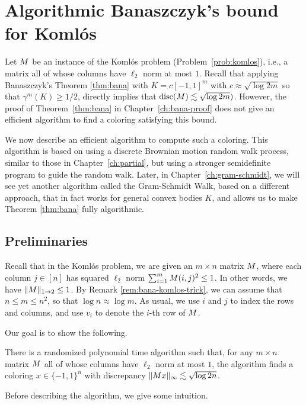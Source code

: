 
\chapter{Algorithmic Banaszczyk's bound for Koml\'os}
\label{ch:algo-komlos-bana}


Let $M$ be an instance of the Koml\'{o}s problem (Problem~\ref{prob:komlos}), i.e., a matrix all of whose columns have $\ell_2$ norm at most $1$.
Recall that %
applying Banaszczyk's Theorem \ref{thm:bana} with $K = c [-1,1]^m$ with $c \approx \sqrt{\log 2m}$ so that $\gamma^m(K)\geq 1/2$, directly implies that $\operatorname{disc}(M) \lesssim \sqrt{\log 2m})$. However, the proof of Theorem~\ref{thm:bana} in Chapter~\ref{ch:bana-proof} does not give an efficient algorithm to find a coloring satisfying this bound.

We now describe an efficient algorithm to compute such a coloring.
This algorithm is based on using a discrete Brownian motion random walk process, similar to those in Chapter~\ref{ch:partial}, but using a stronger semidefinite program to guide the random walk. 
Later, in Chapter~\ref{ch:gram-schmidt}, we will see yet another algorithm called the Gram-Schmidt Walk, based on a different approach, that in fact works for general convex bodies $K$, and allows us to make Theorem \ref{thm:bana} fully algorithmic.

\section{Preliminaries}
Recall that in the Koml\'os problem, we are given an $m\times n$ matrix $M$, where each column $j\in [n]$ has squared $\ell_2$ norm $\sum_{i=1}^m M(i,j)^2\leq 1$. In other words, we have $\|M\|_{1\to 2} \le 1$.
By Remark \ref{rem:bana-komlos-trick}, we can assume that $n \leq m \leq n^2$, so that $\log n \approx \log m$.
As usual, we use $i$ and $j$ to index the rows and columns, and use $v_i$ to denote the $i$-th row of $M$.

Our goal is to show the following.
\begin{theorem}
There is a randomized polynomial time algorithm such that, for any $m\times n$ matrix $M$ all of whose columns have $\ell_2$ norm at most $1$, the algorithm finds a coloring $x \in \{-1,1\}^n$ with discrepancy $\|M x\|_\infty \lesssim  \sqrt{\log 2n}$.
\end{theorem}
Before describing the algorithm, we give some intuition.

